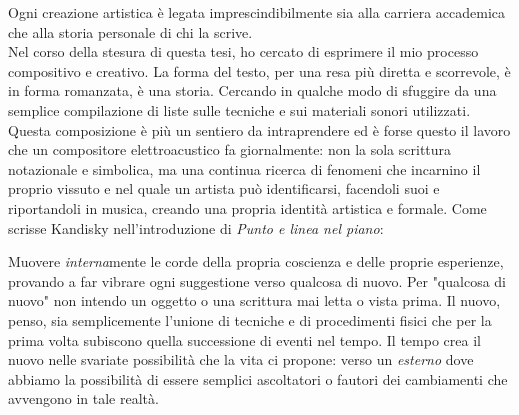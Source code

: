 


Ogni creazione artistica è legata imprescindibilmente sia alla carriera accademica che alla storia personale di chi la scrive. \\
Nel corso della stesura di questa tesi, ho cercato di esprimere il mio processo compositivo e creativo. La forma del testo, per una resa più diretta e scorrevole, è in forma romanzata, è una storia. Cercando in qualche modo di sfuggire da una semplice compilazione di liste sulle tecniche e sui materiali sonori utilizzati. \\
Questa composizione è più un sentiero da intraprendere ed è forse questo il lavoro che un compositore elettroacustico fa giornalmente: non la sola scrittura notazionale e simbolica, ma una continua ricerca di fenomeni che incarnino il proprio vissuto e nel quale un artista può identificarsi, facendoli suoi e riportandoli in musica, creando una propria identità artistica e formale. Come scrisse Kandisky nell'introduzione di \textit{Punto e linea nel piano}: 


Muovere \textit{interna}mente le corde della propria coscienza e delle proprie esperienze, provando a far vibrare ogni suggestione verso qualcosa di nuovo. Per "qualcosa di nuovo" non intendo un oggetto o una scrittura mai letta o vista prima. Il nuovo, penso, sia semplicemente l'unione di tecniche e di procedimenti fisici che per la prima volta subiscono quella successione di eventi nel tempo. Il tempo crea il nuovo nelle svariate possibilità che la vita ci propone: verso un \textit{esterno} dove abbiamo la possibilità di essere semplici ascoltatori o fautori dei cambiamenti che avvengono in tale realtà. 
